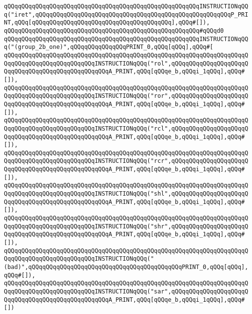 \verb|qQQqqQQqqQQqqQQqqQQqqQQqqQQqqQQqqQQqqQQqqQQqqQQqqQQqqQQqINSTRUCTIONqQQq("iret",qQQqqQQqqQQqqQQqqQQqqQQqqQQqqQQqqQQqqQQqqQQqqQQqqQQqqQQqP_PRINT,qQQq[qQQqqQQqqQQqqQQqqQQqqQQqqQQqqQQqqQQqqQQq],qQQq#[]),|\newline
\verb|qQQqqQQqqQQqqQQqqQQqqQQqqQQqqQQqqQQqqQQqqQQqqQQqqQQqqQQq#qQQqd0|\newline
\verb|qQQqqQQqqQQqqQQqqQQqqQQqqQQqqQQqqQQqqQQqqQQqqQQqqQQqqQQqINSTRUCTIONqQQq("(group_2b_one)",qQQqqQQqqQQqqQQqPRINT_0,qQQq[qQQq],qQQq#[|\newline
\verb|qQQqqQQqqQQqqQQqqQQqqQQqqQQqqQQqqQQqqQQqqQQqqQQqqQQqqQQqqQQqqQQqqQQqqQQqqQQqqQQqqQQqqQQqqQQqqQQqINSTRUCTIONqQQq("rol",qQQqqQQqqQQqqQQqqQQqqQQqqQQqqQQqqQQqqQQqqQQqqQQqqQQqA_PRINT,qQQq[qQQqe_b,qQQqi_1qQQq],qQQq#[]),|\newline
\verb|qQQqqQQqqQQqqQQqqQQqqQQqqQQqqQQqqQQqqQQqqQQqqQQqqQQqqQQqqQQqqQQqqQQqqQQqqQQqqQQqqQQqqQQqqQQqqQQqINSTRUCTIONqQQq("ror",qQQqqQQqqQQqqQQqqQQqqQQqqQQqqQQqqQQqqQQqqQQqqQQqqQQqA_PRINT,qQQq[qQQqe_b,qQQqi_1qQQq],qQQq#[]),|\newline
\verb|qQQqqQQqqQQqqQQqqQQqqQQqqQQqqQQqqQQqqQQqqQQqqQQqqQQqqQQqqQQqqQQqqQQqqQQqqQQqqQQqqQQqqQQqqQQqqQQqINSTRUCTIONqQQq("rcl",qQQqqQQqqQQqqQQqqQQqqQQqqQQqqQQqqQQqqQQqqQQqqQQqqQQqA_PRINT,qQQq[qQQqe_b,qQQqi_1qQQq],qQQq#[]),|\newline
\verb|qQQqqQQqqQQqqQQqqQQqqQQqqQQqqQQqqQQqqQQqqQQqqQQqqQQqqQQqqQQqqQQqqQQqqQQqqQQqqQQqqQQqqQQqqQQqqQQqINSTRUCTIONqQQq("rcr",qQQqqQQqqQQqqQQqqQQqqQQqqQQqqQQqqQQqqQQqqQQqqQQqqQQqA_PRINT,qQQq[qQQqe_b,qQQqi_1qQQq],qQQq#[]),|\newline
\verb|qQQqqQQqqQQqqQQqqQQqqQQqqQQqqQQqqQQqqQQqqQQqqQQqqQQqqQQqqQQqqQQqqQQqqQQqqQQqqQQqqQQqqQQqqQQqqQQqINSTRUCTIONqQQq("shl",qQQqqQQqqQQqqQQqqQQqqQQqqQQqqQQqqQQqqQQqqQQqqQQqqQQqA_PRINT,qQQq[qQQqe_b,qQQqi_1qQQq],qQQq#[]),|\newline
\verb|qQQqqQQqqQQqqQQqqQQqqQQqqQQqqQQqqQQqqQQqqQQqqQQqqQQqqQQqqQQqqQQqqQQqqQQqqQQqqQQqqQQqqQQqqQQqqQQqINSTRUCTIONqQQq("shr",qQQqqQQqqQQqqQQqqQQqqQQqqQQqqQQqqQQqqQQqqQQqqQQqqQQqA_PRINT,qQQq[qQQqe_b,qQQqi_1qQQq],qQQq#[]),|\newline
\verb|qQQqqQQqqQQqqQQqqQQqqQQqqQQqqQQqqQQqqQQqqQQqqQQqqQQqqQQqqQQqqQQqqQQqqQQqqQQqqQQqqQQqqQQqqQQqqQQqINSTRUCTIONqQQq("(bad)",qQQqqQQqqQQqqQQqqQQqqQQqqQQqqQQqqQQqqQQqqQQqPRINT_0,qQQq[qQQq],qQQq#[]),|\newline
\verb|qQQqqQQqqQQqqQQqqQQqqQQqqQQqqQQqqQQqqQQqqQQqqQQqqQQqqQQqqQQqqQQqqQQqqQQqqQQqqQQqqQQqqQQqqQQqqQQqINSTRUCTIONqQQq("sar",qQQqqQQqqQQqqQQqqQQqqQQqqQQqqQQqqQQqqQQqqQQqqQQqqQQqA_PRINT,qQQq[qQQqe_b,qQQqi_1qQQq],qQQq#[])|\newline
